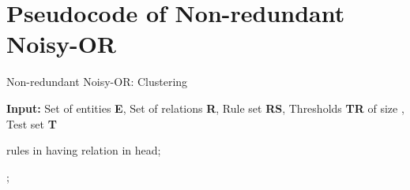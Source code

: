 \documentclass[akbc,twoside,11pt,lettersize]{article}
\begin{document}
\section{Pseudocode of Non-redundant Noisy-OR}
\label{appendix:pseudo}
\begin{algorithm}
\scriptsize
\caption{Non-redundant Noisy-OR: Clustering}
\label{PseudoNRNO}
    \begin{algorithmic}
        \State \textbf{Input:} Set of entities \textbf{E}, Set of relations \textbf{R}, Rule set \textbf{RS}, Thresholds \textbf{TR} of size , Test set \textbf{T}
         
        
            \State   rules in  having relation  in head;
                    \State 
                \EndFor
            \EndFor
            
            \State 
                \State 
            \EndFor
                
                \If{}
                    \State 
                    \State 
                        \State 
                        \State 
                        \State 
                            \If{}
                                \If{}
                                    \State 
                                \EndIf
                            \EndIf
                        \EndFor
                    \EndWhile
                    \State 
                \EndIf
            \EndFor
        \EndFor
        
         
                \State 
            \EndFor
                    \State 
                \EndFor
                    \State 
                        \If{}
                            \State ;
                        \EndIf
                    \EndFor
                \EndFor
                    \State 
                \EndFor
            \EndFor
       \EndFor
        
        
    \end{algorithmic}
\end{algorithm}
\end{document}
